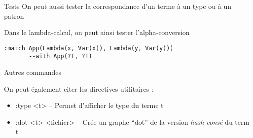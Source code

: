 \begin{frame}[fragile]{Tests}
  On peut aussi tester la correspondance d'un terme à un type ou à un
  patron

  \bigskip
  Dans le lambda-calcul, on peut ainsi tester l'alpha-conversion
\begin{verbatim}
:match App(Lambda(x, Var(x)), Lambda(y, Var(y))) 
       --with App(?T, ?T) 
\end{verbatim}

\end{frame}

\begin{frame}{Autres commandes}
  
  On peut également citer les directives utilitaires :
  \bigskip

  \begin{itemize}
  \item :type <t> -- Permet d'afficher le type du terme t
  \bigskip

  \item :dot <t> <fichier> -- Crée un graphe ``dot'' de la version \emph{hash-consé} du term t
  \end{itemize}

\end{frame}
